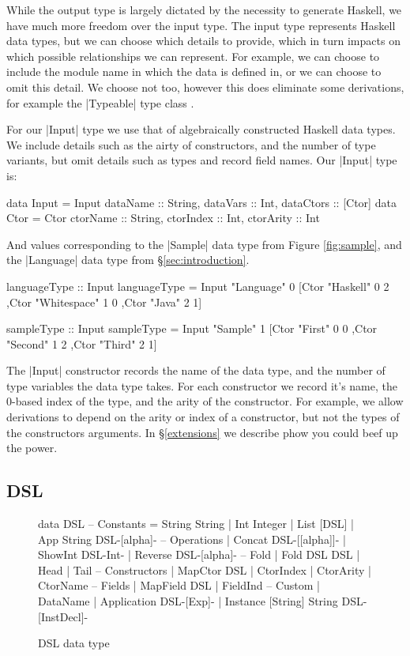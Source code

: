 \documentclass[preprint]{sigplanconf}
\begin{document}
While the output type is largely dictated by the necessity to generate Haskell, we have much more freedom over the input type. The input type represents Haskell data types, but we can choose which details to provide, which in turn impacts on which possible relationships we can represent. For example, we can choose to include the module name in which the data is defined in, or we can choose to omit this detail. We choose not too, however this does eliminate some derivations, for example the |Typeable| type class \cite{syb1}.

For our |Input| type we use that of algebraically constructed Haskell data types. We include details such as the airty of constructors, and the number of type variants, but omit details such as types and record field names. Our |Input| type is:

\begin{code}
data Input = Input {dataName :: String, dataVars :: Int, dataCtors :: [Ctor]}
data Ctor = Ctor {ctorName :: String, ctorIndex :: Int, ctorArity :: Int}
\end{code}

And values corresponding to the |Sample| data type from Figure \ref{fig:sample}, and the |Language| data type from \S\ref{sec:introduction}.

\begin{code}
languageType :: Input
languageType = Input "Language" 0
    [Ctor "Haskell" 0 2
    ,Ctor "Whitespace" 1 0
    ,Ctor "Java" 2 1]

sampleType :: Input
sampleType = Input "Sample" 1
    [Ctor "First" 0 0
    ,Ctor "Second" 1 2
    ,Ctor "Third" 2 1]
\end{code}

The |Input| constructor records the name of the data type, and the number of type variables the data type takes. For each constructor we record it's name, the 0-based index of the type, and the arity of the constructor. For example, we allow derivations to depend on the arity or index of a constructor, but not the types of the constructors arguments. In \S\ref{extensions} we describe phow you could beef up the power.

\subsection{DSL}

\begin{figure}
\begin{code}
data DSL
    -- Constants
    = String String
    | Int Integer
    | List [DSL]
    | App String DSL{-[alpha]-}
    -- Operations
    | Concat DSL{-[[alpha]]-}
    | ShowInt DSL{-Int-}
    | Reverse DSL{-[alpha]-}
    -- Fold
    | Fold DSL DSL
    | Head
    | Tail
    -- Constructors
    | MapCtor DSL
    | CtorIndex
    | CtorArity
    | CtorName
    -- Fields
    | MapField DSL
    | FieldInd
    -- Custom
    | DataName
    | Application DSL{-[Exp]-}
    | Instance [String] String DSL{-[InstDecl]-}
\end{code}
\caption{DSL data type}
\label{fig:dsl}
\end{figure}
\end{document}
